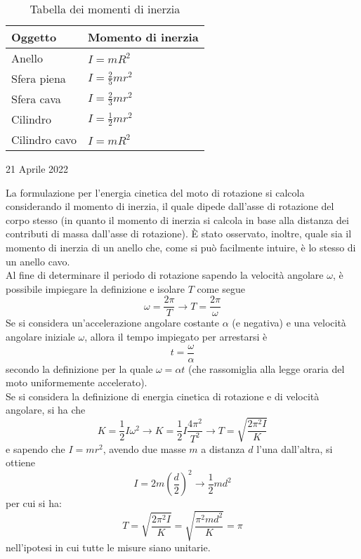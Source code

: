 \documentclass[a4paper]{extarticle}
\renewcommand\arraystretch{}
\begin{document}
\begin{table}[H]
  \centering
  \setlength{\tabcolsep}{4pt}
  \renewcommand{\arraystretch}{2.3}
  \begin{tabularx}{0.5 \textwidth}{|P|P|}
    \hline
    \textbf{Oggetto} & \textbf{Momento di inerzia}\\
    \hline
    Anello & $\displaystyle{I=m R^2}$\\
    \hline
    Sfera piena & $\displaystyle{I=\frac{2}{5} m r^2}$\\
    \hline
    Sfera cava & $\displaystyle{I=\frac{2}{3} m r^2}$\\
    \hline
    Cilindro & $\displaystyle{I=\frac{1}{2} m r^2}$\\
    \hline
    Cilindro cavo & $\displaystyle{I=m R^2}$\\
    \hline
  \end{tabularx}
  \caption{Tabella dei momenti di inerzia}
  \label{tab:tabella_momenti_inerzia}
\end{table}

\newpage
\noindent
\begin{center}
  21 Aprile 2022
\end{center}
La formulazione per l'energia cinetica del moto di rotazione si calcola considerando il momento di inerzia, il quale dipede dall'asse di rotazione del corpo stesso (in quanto il momento di inerzia si calcola in base alla distanza dei contributi di massa dall'asse di rotazione). È stato osservato, inoltre, quale sia il momento di inerzia di un anello che, come si può facilmente intuire, è lo stesso di un anello cavo.\\
Al fine di determinare il periodo di rotazione sapendo la velocità angolare $\omega$, è possibile impiegare la definizione e isolare $T$ come segue
\[\omega=\frac{2\pi}{T} \longrightarrow T=\frac{2\pi}{\omega}\]
Se si considera un'accelerazione angolare costante $\alpha$ (e negativa) e una velocità angolare iniziale $\omega$, allora il tempo impiegato per arrestarsi è
\[t=\frac{\omega}{\alpha}\]
secondo la definizione per la quale $\omega= \alpha t$ (che rassomiglia alla legge oraria del moto uniformemente accelerato).\\
Se si considera la definizione di energia cinetica di rotazione e di velocità angolare, si ha che
\[K=\frac{1}{2}I \omega^2 \longrightarrow K=\frac{1}{2} I \frac{4\pi^2}{T^2} \longrightarrow T=\sqrt{\frac{2\pi^2 I}{K}}\]
e sapendo che $I=m r^2$, avendo due masse $m$ a distanza $d$ l'una dall'altra, si ottiene
\[I=2m \left(\frac{d}{2}\right)^2 \longrightarrow \frac{1}{2}md^2\]
per cui si ha:
\[T=\sqrt{\frac{2\pi^2 I}{K}}=\sqrt{\frac{\pi^2 m d^2}{K}} = \pi\]
nell'ipotesi in cui tutte le misure siano unitarie.
\end{document}

